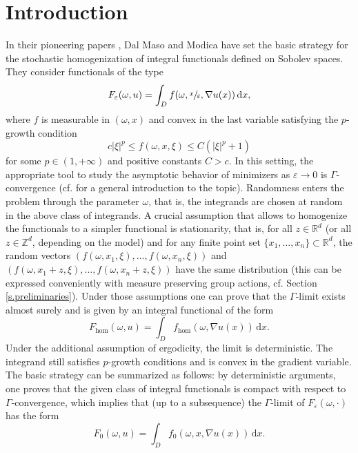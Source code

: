 \documentclass[11pt]{article}
\newcommand{\cf}{cf.\xspace}
\numberwithin{equation}{section}
\theoremstyle{definition}
\let\e\varepsilon
\let\w\omega
\newcommand{\dx}{\,\mathrm{d}x}
\newcommand{\R}{\mathbb{R}}
\newcommand{\Z}{\mathbb{Z}}
\begin{document}
\section{Introduction}
In their pioneering papers \cite{DMMoI,DMMoII}, Dal Maso and Modica have set the basic strategy for the stochastic homogenization of integral functionals defined on Sobolev spaces. They consider functionals of the type
\begin{equation}\label{eq:F_eps}
F_{\e}(\w,u)=\int_D f(\w,\sfrac{x}{\e},\nabla u(x))\dx,
\end{equation}
where $f$ is measurable in $(\w,x)$ and convex in the last variable satisfying the $p$-growth condition
\begin{equation}\label{eq:p-growth}
c|\xi|^p\leq f(\w,x,\xi)\leq C(|\xi|^p+1)
\end{equation}
for some $p\in (1,+\infty)$ and positive constants $C>c$. In this setting, the appropriate tool to study the asymptotic behavior of minimizers as $\e\to 0$ is $\Gamma$-convergence (\cf \cite{Br,DM} for a general introduction to the topic). Randomness enters the problem through the parameter $\w$, that is, the integrands are chosen at random in the above class of integrands. A crucial assumption that allows to homogenize the functionals to a simpler functional is stationarity, that is, for all $z\in\R^d$ (or all $z\in\Z^d$, depending on the model) and for any finite point set $\{x_1,\ldots,x_n\}\subset\R^d$, the random vectors $(f(\w,x_1,\xi),\ldots,f(\w,x_n,\xi))$ and $(f(\w,x_1+z,\xi),\ldots,f(\w,x_n+z,\xi))$ have the same distribution (this can be expressed conveniently with measure preserving group actions, \cf Section \ref{s.preliminaries}). Under those assumptions one can prove that the $\Gamma$-limit exists almost surely and is given by an integral functional of the form
\begin{equation*}
F_{\hom}(\w,u)=\int_D f_{\hom}(\w,\nabla u(x))\dx.
\end{equation*}
Under the additional assumption of ergodicity, the limit is deterministic. The integrand still satisfies $p$-growth conditions and is convex in the gradient variable. The basic strategy can be summarized as follows: by deterministic arguments, one proves that the given class of integral functionals is compact with respect to $\Gamma$-convergence, which implies that (up to a subsequence) the $\Gamma$-limit of $F_{\e}(\w,\cdot)$ has the form
\begin{equation*}
F_{0}(\w,u)=\int_D f_0(\w,x,\nabla u(x))\dx.
\end{equation*}
\end{document}
